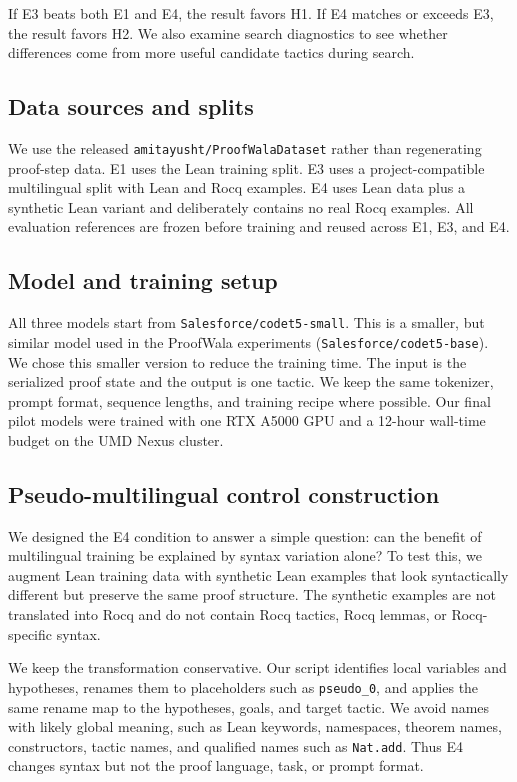 \documentclass{article} %
\begin{document}
If E3 beats both E1 and E4, the result favors H1.  If E4 matches or exceeds
E3, the result favors H2.  We also examine search diagnostics to see whether
differences come from more useful candidate tactics during search.

\subsection{Data sources and splits}
\label{subsec:data}

We use the released \texttt{amitayusht/ProofWalaDataset} rather than regenerating
proof-step data.  E1 uses the Lean training split.  E3 uses a project-compatible
multilingual split with Lean and Rocq examples.  E4 uses Lean data plus a
synthetic Lean variant and deliberately contains no real Rocq examples.  All
evaluation references are frozen before training and reused across E1, E3, and
E4.

\subsection{Model and training setup}
\label{subsec:training}

All three models start from \texttt{Salesforce/codet5-small}. This is a smaller, but similar model used in the ProofWala experiments (\texttt{Salesforce/codet5-base}). We chose this smaller version to reduce the training time. The input is the
serialized proof state and the output is one tactic.  We keep the same tokenizer,
prompt format, sequence lengths, and training recipe where possible.  Our final
pilot models were trained with one RTX
A5000 GPU and a 12-hour wall-time budget on the UMD Nexus cluster.


\subsection{Pseudo-multilingual control construction}
\label{subsec:e4}

We designed the E4 condition to answer a simple question: can the benefit of
multilingual training be explained by syntax variation alone?  To test
this, we augment Lean training data with synthetic Lean examples that look
syntactically different but preserve the same proof structure.  The
synthetic examples are not translated into Rocq and do not contain Rocq tactics,
Rocq lemmas, or Rocq-specific syntax.

We keep the transformation conservative.  Our script identifies local variables
and hypotheses, renames them to placeholders such as \texttt{pseudo\_0}, and
applies the same rename map to the hypotheses, goals, and target tactic.  We
avoid names with likely global meaning, such as Lean keywords, namespaces,
theorem names, constructors, tactic names, and qualified names such as
\texttt{Nat.add}.  Thus E4 changes syntax but not the proof language, task, or
prompt format.
\end{document}
